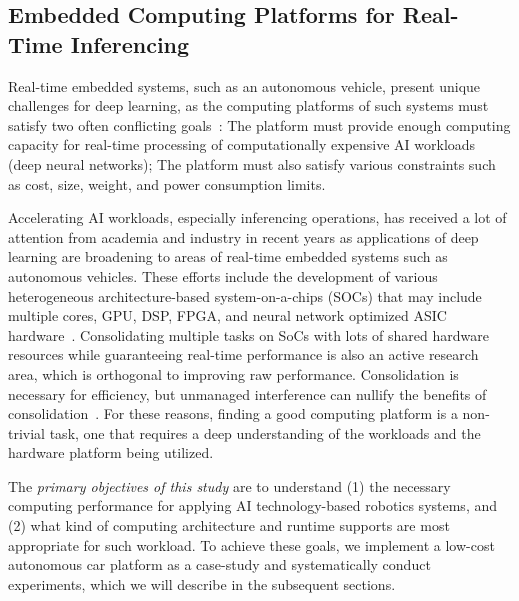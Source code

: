 \subsection{Embedded Computing Platforms for Real-Time Inferencing}
Real-time embedded systems, such as an autonomous vehicle, present
unique challenges for deep learning, as the computing platforms of such
systems must satisfy two often conflicting goals~\cite{Otterness2017}:
The platform must provide 
enough computing capacity for real-time processing of computationally
expensive AI workloads (deep neural networks);
The platform must also satisfy various
constraints such as cost, size, weight, and power consumption limits.

Accelerating AI workloads, especially inferencing
operations, has received a lot of attention from academia and industry
in recent years as applications of deep learning are broadening to
areas of real-time embedded systems such as autonomous vehicles. These
efforts include the development of various heterogeneous architecture-based 
system-on-a-chips (SOCs) that may include multiple cores, GPU,
DSP, FPGA, and neural network optimized ASIC hardware~\cite{Jouppi2017}.
Consolidating multiple tasks on SoCs with lots of shared hardware
resources while guaranteeing real-time performance is also an active
research area, which is orthogonal to improving raw
performance. Consolidation is necessary for efficiency, but unmanaged 
interference can nullify the benefits of consolidation~\cite{Kim2016}.
For these reasons, finding a good computing platform is a
non-trivial task, one that requires a deep understanding of the
workloads and the hardware platform being utilized.

The \emph{primary objectives of this study} are to understand (1) the
necessary computing performance for applying AI technology-based
robotics systems, and (2) what kind of computing architecture and
runtime supports are most appropriate for such workload. To
achieve these goals, we implement a low-cost autonomous car platform
as a case-study and systematically conduct experiments, which we will 
describe in the subsequent sections.
